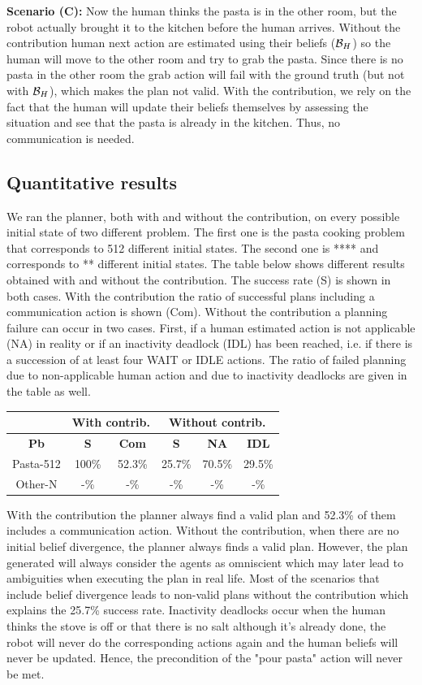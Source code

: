 \documentclass[letterpaper]{article} %
\begin{document}
\textbf{Scenario (C):} Now the human thinks the pasta is in the other room, but the robot actually brought it to the kitchen before the human arrives. Without the contribution human next action are estimated using their beliefs ($\mathcal{B}_H$) so the human will move to the other room and try to grab the pasta. Since there is no pasta in the other room the grab action will fail with the ground truth (but not with $\mathcal{B}_H$), which makes the plan not valid. With the contribution, we rely on the fact that the human will update their beliefs themselves by assessing the situation and see that the pasta is already in the kitchen. Thus, no communication is needed.

\subsection{Quantitative results}

We ran the planner, both with and without the contribution, on every possible initial state of two different problem. The first one is the pasta cooking problem that corresponds to 512 different initial states. The second one is **** and corresponds to ** different initial states. The table below shows different results obtained with and without the contribution. The success rate (S) is shown in both cases. With the contribution the ratio of successful plans including a communication action is shown (Com). Without the contribution a planning failure can occur in two cases. First, if a human estimated action is not applicable (NA) in reality  or if an inactivity deadlock (IDL) has been reached, i.e. if there is a succession of at least four WAIT or IDLE actions. The ratio of failed planning due to non-applicable human action and due to inactivity deadlocks are given in the table as well.
\begin{tabular}{|c||c|c||c|c|c|}
    \hline
    & \multicolumn{2}{|c||}{\textbf{With contrib.}} & \multicolumn{3}{c|}{\textbf{Without contrib.}}\\
    \hline
    \textbf{Pb} & \textbf{S} & \textbf{Com} & \textbf{S} & \textbf{NA} & \textbf{IDL}\\
    \hline
    Pasta-512 & 100\% & 52.3\% & 25.7\% & 70.5\% & 29.5\%\\
    \hline
    Other-N & -\% & -\% & -\% & -\% & -\%\\
    \hline 
\end{tabular}

With the contribution the planner always find a valid plan and 52.3\% of them includes a communication action. 
Without the contribution, when there are no initial belief divergence, the planner always finds a valid plan. However, the plan generated will always consider the agents as omniscient which may later lead to ambiguities when executing the plan in real life. Most of the scenarios that include belief divergence leads to non-valid plans without the contribution which explains the 25.7\% success rate. Inactivity deadlocks occur when the human thinks the stove is off or that there is no salt although it's already done, the robot will never do the corresponding actions again and the human beliefs will never be updated. Hence, the precondition of the "pour pasta" action will never be met.
\end{document}
